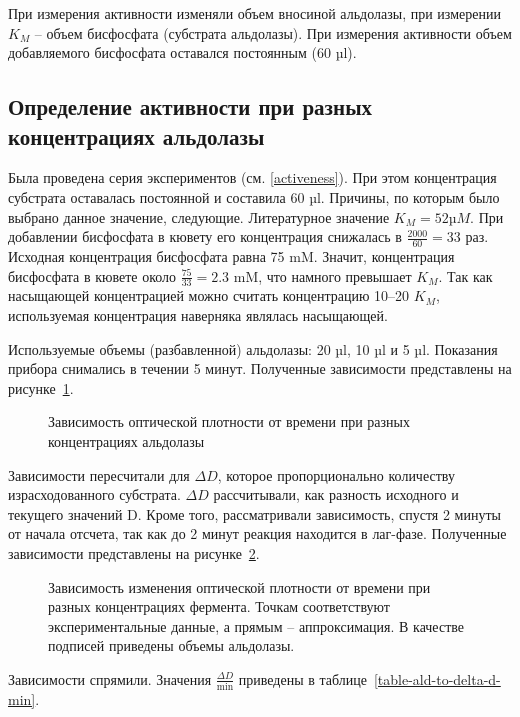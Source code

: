 При измерения активности изменяли объем вносиной альдолазы,
при измерении $K_M$ -- объем бисфосфата (субстрата альдолазы).
При измерения активности объем добавляемого
бисфосфата оставался постоянным (60 µl).

\subsection{Определение активности при разных концентрациях альдолазы}
Была проведена серия экспериментов (см. \ref{activeness}).
При этом концентрация субстрата оставалась постоянной и составила 60 µl.
Причины, по которым было выбрано данное значение, следующие.
Литературное значение $K_M = 52 µM$.
При добавлении бисфосфата в кювету его концентрация снижалась в $\frac{2000}{60} = 33$ раз.
Исходная концентрация бисфосфата равна 75 mM.
Значит, концентрация бисфосфата в кювете около $\frac{75}{33} = 2.3$ mM,
что намного превышает $K_M$.
Так как насыщающей концентрацией можно считать концентрацию 10--20 $K_M$,
используемая концентрация наверняка являлась насыщающей.

Используемые объемы (разбавленной) альдолазы: 20 µl, 10 µl и 5 µl.
Показания прибора снимались в течении 5 минут.
Полученные зависимости представлены на рисунке~\ref{act-time-to-d}.

\begin{figure}[htbp]

\caption[Зависимость оптической плотности от времени]
    {Зависимость оптической плотности от времени
    при разных концентрациях альдолазы}
\label{act-time-to-d}
\end{figure}

Зависимости пересчитали для $\Delta D$,
которое пропорционально количеству израсходованного субстрата.
$\Delta D$ рассчитывали, как разность исходного и текущего значений D.
Кроме того, рассматривали зависимость, спустя 2 минуты от начала отсчета,
так как до 2 минут реакция находится в лаг-фазе.
Полученные зависимости представлены на рисунке~\ref{act-time-to-delta-d}.

\begin{figure}[htbp]

\caption[Зависимость изменения оптической плотности от времени]
    {Зависимость изменения оптической плотности от времени
    при разных концентрациях фермента.
    Точкам соответствуют экспериментальные данные, а прямым -- аппроксимация.
    В качестве подписей приведены объемы альдолазы.}
\label{act-time-to-delta-d}
\end{figure}

Зависимости спрямили.
Значения $\frac{\Delta D}{\text{min}}$ приведены
в таблице~\ref{table-ald-to-delta-d-min}.

